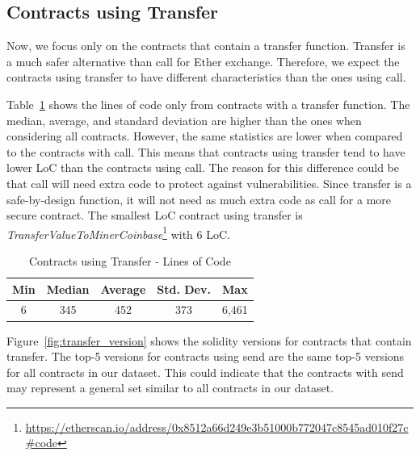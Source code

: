 \documentclass[10pt,conference]{IEEEtran}
\begin{document}
\subsection{Contracts using Transfer}

Now, we focus only on the contracts that contain a transfer function. Transfer is a much safer alternative than call for Ether exchange. Therefore, we expect the contracts using transfer to have different characteristics than the ones using call.

Table~\ref{tab:transfer-loc} shows the lines of code only from contracts with a transfer function. The median, average, and standard deviation are higher than the ones when considering all contracts. However, the same statistics are lower when compared to the contracts with call. This means that contracts using transfer tend to have lower LoC than the contracts using call. The reason for this difference could be that call will need extra code to protect against vulnerabilities. Since transfer is a safe-by-design function, it will not need as much extra code as call for a more secure contract. The smallest LoC contract using transfer is \textit{TransferValueToMinerCoinbase}\footnote{\url{https://etherscan.io/address/0x8512a66d249e3b51000b772047c8545ad010f27c\#code}} with 6 LoC.


\begin{table}[t]
\center
  \caption{Contracts using Transfer - Lines of Code}
  \label{tab:transfer-loc}
  \begin{tabular}{c c c c c}
    \hline
    Min & Median & Average & Std. Dev. & Max \\
    \hline
   6 & 345 & 452 & 373 & 6,461 \\
  \hline
\end{tabular}
\end{table}

Figure~\ref{fig:transfer_version} shows the solidity versions for contracts that contain transfer.  The top-5 versions for contracts using send are the same top-5 versions for all contracts in our dataset.  This could indicate that the contracts with send may represent a general set similar to all contracts in our dataset.
\end{document}
